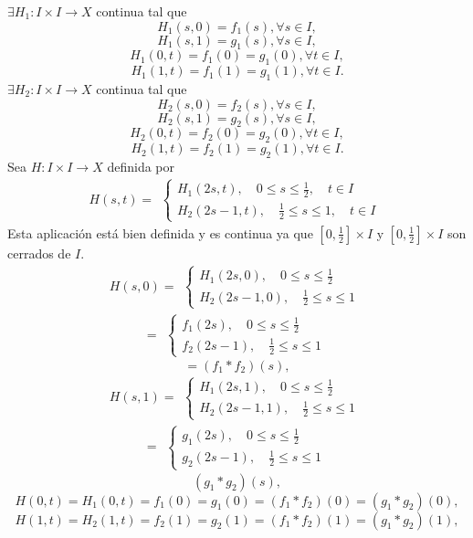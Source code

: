 \begin{dem}
  $\exists H_{1} : I \times I \to X$ continua tal que
  \[ 
    H_{1}(s,0) = f_{1}(s), \forall s \in I,
  \] 
  \[ 
    H_{1}(s,1) = g_{1}(s), \forall s \in I,
  \] 
  \[ 
    H_{1}(0, t) = f_{1}(0) = g_{1}(0), \forall t \in I,
  \] 
  \[ 
    H_{1}(1, t) = f_{1}(1) = g_{1}(1), \forall t \in I.
  \] 
  $\exists H_{2} : I \times I \to X$ continua tal que
  \[ 
    H_{2}(s,0) = f_{2}(s), \forall s \in I,
  \] 
  \[ 
    H_{2}(s,1) = g_{2}(s), \forall s \in I,
  \] 
  \[ 
    H_{2}(0, t) = f_{2}(0) = g_{2}(0), \forall t \in I,
  \] 
  \[ 
    H_{2}(1, t) = f_{2}(1) = g_{2}(1), \forall t \in I.
  \] 
  Sea $H : I \times I \to X$ definida por
  \[ 
    H(s,t) =
    \begin{aligned}
      \begin{cases}
        H_{1}(2s, t), \quad 0 \leq s \leq \frac{1}{2}, \quad t \in I \\
        H_{2}(2s - 1, t), \quad \frac{1}{2} \leq s \leq 1, \quad t \in I
      \end{cases}
    \end{aligned} 
  \] 
  Esta aplicación está bien definida y es continua ya que $[0, \frac{1}{2}] \times I$ y $[0, \frac{1}{2}] \times I$ son cerrados de $I$.
  \[ 
    H(s,0) =
    \begin{aligned}
      \begin{cases}
        H_{1}(2s, 0), \quad 0 \leq s \leq \frac{1}{2} \\
        H_{2}(2s - 1, 0), \quad \frac{1}{2} \leq s \leq 1
      \end{cases}
    \end{aligned} 
  \] 
  \[ 
     =
    \begin{aligned}
      \begin{cases}
        f_{1}(2s), \quad 0 \leq s \leq \frac{1}{2} \\
        f_{2}(2s - 1), \quad \frac{1}{2} \leq s \leq 1
      \end{cases}
    \end{aligned} 
  \] 
  \[ 
    = (f_{1} * f_{2})(s),
  \] 
  \[ 
    H(s,1) =
    \begin{aligned}
      \begin{cases}
        H_{1}(2s, 1), \quad 0 \leq s \leq \frac{1}{2} \\
        H_{2}(2s - 1, 1), \quad \frac{1}{2} \leq s \leq 1
      \end{cases}
    \end{aligned} 
  \] 
  \[ 
     =
    \begin{aligned}
      \begin{cases}
        g_{1}(2s), \quad 0 \leq s \leq \frac{1}{2} \\
        g_{2}(2s - 1), \quad \frac{1}{2} \leq s \leq 1
      \end{cases}
    \end{aligned} 
  \] 
  \[ 
    (g_{1} * g_{2})(s),
  \] 
  \[ 
    H(0, t) = H_{1}(0, t) = f_{1}(0) = g_{1}(0) = (f_{1} * f_{2})(0) = (g_{1} * g_{2})(0),
  \] 
  \[ 
    H(1, t) = H_{2}(1, t) = f_{2}(1) = g_{2}(1) = (f_{1} * f_{2})(1) = (g_{1} * g_{2})(1),
  \] 
\end{dem}

